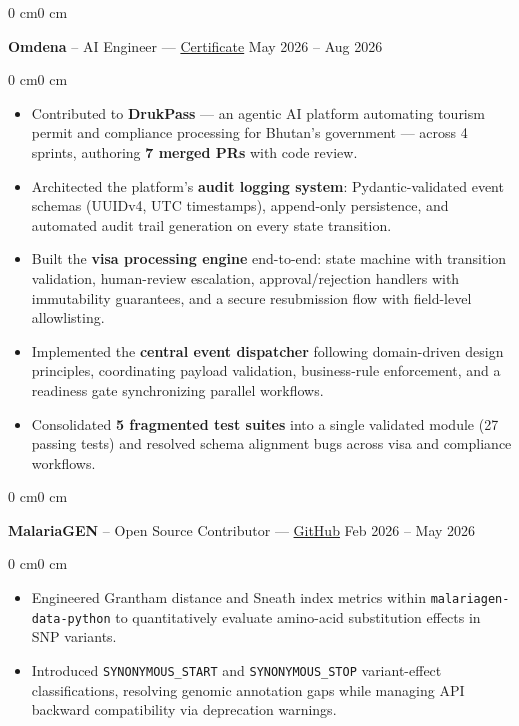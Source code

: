 \documentclass[10pt, letterpaper]{article}
\newenvironment{highlights}{\begin{itemize}[topsep=0.05 cm, parsep=0.05 cm, partopsep=0pt, itemsep=0pt, leftmargin=10pt]}{\end{itemize}}
\newenvironment{onecolentry}{\begin{adjustwidth}{0 cm}{0 cm}}{\end{adjustwidth}}
\newenvironment{twocolentry}[2][]{%
    \onecolentry
    \def\secondColumn{#2}%
}{%
    \unskip\hfill\secondColumn
    \endonecolentry
}
\begin{document}
\begin{twocolentry}{May 2026 -- Aug 2026}
    \textbf{Omdena} -- AI Engineer --- \href{https://confirm.omdena.com/INd8oz\_}{Certificate}
\end{twocolentry}
\vspace{0.05 cm}
\begin{onecolentry}
\begin{highlights}
\item Contributed to \textbf{DrukPass} --- an agentic AI platform automating tourism permit and compliance processing for Bhutan's government --- across 4 sprints, authoring \textbf{7 merged PRs} with code review.
\item Architected the platform's \textbf{audit logging system}: Pydantic-validated event schemas (UUIDv4, UTC timestamps), append-only persistence, and automated audit trail generation on every state transition.
\item Built the \textbf{visa processing engine} end-to-end: state machine with transition validation, human-review escalation, approval/rejection handlers with immutability guarantees, and a secure resubmission flow with field-level allowlisting.
\item Implemented the \textbf{central event dispatcher} following domain-driven design principles, coordinating payload validation, business-rule enforcement, and a readiness gate synchronizing parallel workflows.
\item Consolidated \textbf{5 fragmented test suites} into a single validated module (27 passing tests) and resolved schema alignment bugs across visa and compliance workflows.
\end{highlights}
\end{onecolentry}

\vspace{0.05cm}

\begin{twocolentry}{Feb 2026 -- May 2026}
    \textbf{MalariaGEN} -- Open Source Contributor --- \href{https://github.com/malariagen/malariagen-data-python/issues?q=is:pr+author:@ZiadXI}{GitHub}
\end{twocolentry}
\vspace{0.05 cm}
\begin{onecolentry}
\begin{highlights}
\item Engineered Grantham distance and Sneath index metrics within \texttt{malariagen-data-python} to quantitatively evaluate amino-acid substitution effects in SNP variants.
\item Introduced \texttt{SYNONYMOUS\_START} and \texttt{SYNONYMOUS\_STOP} variant-effect classifications, resolving genomic annotation gaps while managing API backward compatibility via deprecation warnings.
\end{highlights}
\end{onecolentry}
\end{document}
